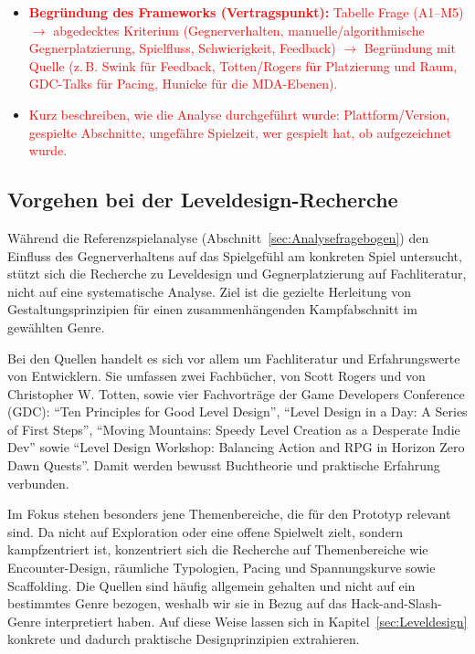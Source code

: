 \documentclass[../Main.tex]{subfiles}
\begin{document}
\begin{itemize}[leftmargin=1.5cm]
    \item \textcolor{red}{\textbf{Begründung des Frameworks (Vertragspunkt):} Tabelle Frage (A1--M5) $\rightarrow$ abgedecktes Kriterium (Gegnerverhalten, manuelle/algorithmische Gegnerplatzierung, Spielfluss, Schwierigkeit, Feedback) $\rightarrow$ Begründung mit Quelle (z.\,B. Swink für Feedback, Totten/Rogers für Platzierung und Raum, GDC-Talks für Pacing, Hunicke für die MDA-Ebenen).}
    \item \textcolor{red}{Kurz beschreiben, wie die Analyse durchgeführt wurde: Plattform/Version, gespielte Abschnitte, ungefähre Spielzeit, wer gespielt hat, ob aufgezeichnet wurde.}
\end{itemize}

\subsection{Vorgehen bei der Leveldesign-Recherche} \label{sec:VorgehenLeveldesign}
Während die Referenzspielanalyse (Abschnitt~\ref{sec:Analysefragebogen}) den Einfluss des Gegnerverhaltens auf das Spielgefühl am konkreten Spiel untersucht, stützt sich die Recherche zu Leveldesign und Gegnerplatzierung auf Fachliteratur, nicht auf eine systematische Analyse. Ziel ist die gezielte Herleitung von Gestaltungsprinzipien für einen zusammenhängenden Kampfabschnitt im gewählten Genre.

Bei den Quellen handelt es sich vor allem um Fachliteratur und Erfahrungswerte von Entwicklern. Sie umfassen zwei Fachbücher,  von Scott Rogers\autocite{rogers2014levelup} und  von Christopher W. Totten\autocite{totten2014architectural}, sowie vier Fachvorträge der Game Developers Conference (GDC): \enquote{Ten Principles for Good Level Design}\autocite{gdc_tenprinciples2010}, \enquote{Level Design in a Day: A Series of First Steps}\autocite{gdc_leveldesignaday2020}, \enquote{Moving Mountains: Speedy Level Creation as a Desperate Indie Dev}\autocite{gdc_movingmountains2020} sowie \enquote{Level Design Workshop: Balancing Action and RPG in Horizon Zero Dawn Quests}\autocite{gdc_horizonquests2018}. Damit werden bewusst Buchtheorie und praktische Erfahrung verbunden.

Im Fokus stehen besonders jene Themenbereiche, die für den Prototyp relevant sind. Da  nicht auf Exploration oder eine offene Spielwelt zielt, sondern kampfzentriert ist, konzentriert sich die Recherche auf Themenbereiche wie Encounter-Design, räumliche Typologien, Pacing und Spannungskurve sowie Scaffolding. Die Quellen sind häufig allgemein gehalten und nicht auf ein bestimmtes Genre bezogen, weshalb wir sie in Bezug auf das Hack-and-Slash-Genre interpretiert haben. Auf diese Weise lassen sich in Kapitel~\ref{sec:Leveldesign} konkrete und dadurch praktische Designprinzipien extrahieren.
\end{document}
